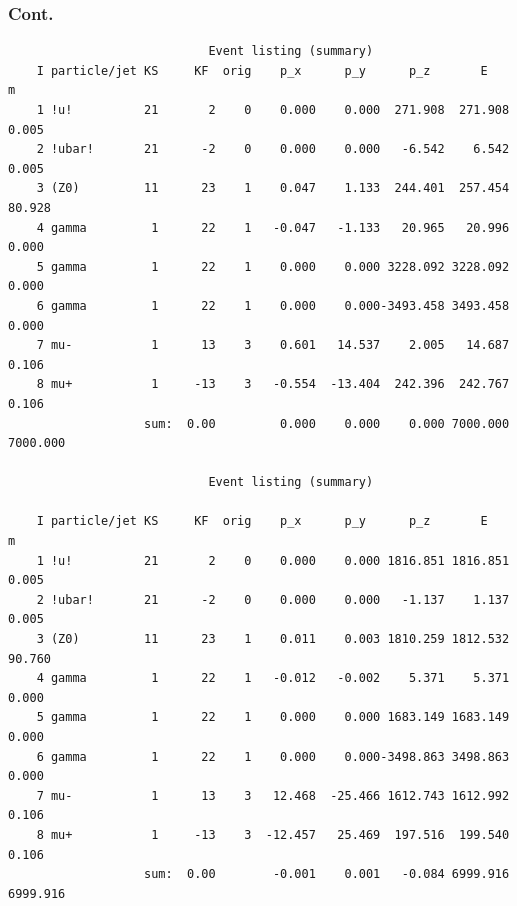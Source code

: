 \documentclass{beamer}
\begin{document}
\begin{frame}[fragile]
\frametitle{ Cont.}

{\tiny
\baselineskip=3pt
\begin{verbatim}
                            Event listing (summary)
    I particle/jet KS     KF  orig    p_x      p_y      p_z       E        m
    1 !u!          21       2    0    0.000    0.000  271.908  271.908    0.005
    2 !ubar!       21      -2    0    0.000    0.000   -6.542    6.542    0.005
    3 (Z0)         11      23    1    0.047    1.133  244.401  257.454   80.928
    4 gamma         1      22    1   -0.047   -1.133   20.965   20.996    0.000
    5 gamma         1      22    1    0.000    0.000 3228.092 3228.092    0.000
    6 gamma         1      22    1    0.000    0.000-3493.458 3493.458    0.000
    7 mu-           1      13    3    0.601   14.537    2.005   14.687    0.106
    8 mu+           1     -13    3   -0.554  -13.404  242.396  242.767    0.106
                   sum:  0.00         0.000    0.000    0.000 7000.000 7000.000

                            Event listing (summary)

    I particle/jet KS     KF  orig    p_x      p_y      p_z       E        m
    1 !u!          21       2    0    0.000    0.000 1816.851 1816.851    0.005
    2 !ubar!       21      -2    0    0.000    0.000   -1.137    1.137    0.005
    3 (Z0)         11      23    1    0.011    0.003 1810.259 1812.532   90.760
    4 gamma         1      22    1   -0.012   -0.002    5.371    5.371    0.000
    5 gamma         1      22    1    0.000    0.000 1683.149 1683.149    0.000
    6 gamma         1      22    1    0.000    0.000-3498.863 3498.863    0.000
    7 mu-           1      13    3   12.468  -25.466 1612.743 1612.992    0.106
    8 mu+           1     -13    3  -12.457   25.469  197.516  199.540    0.106
                   sum:  0.00        -0.001    0.001   -0.084 6999.916 6999.916



\end{verbatim}}
\end{frame}
\end{document}
